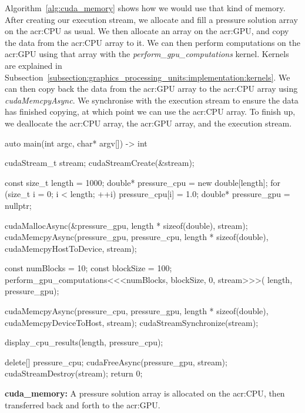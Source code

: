 Algorithm~\ref{alg:cuda_memory} shows how we would use that kind of memory. After creating our
execution stream, we allocate and fill a pressure solution array on the \acrshort{acr:CPU} as usual.
We then allocate an array on the \acrshort{acr:GPU}, and copy the data from the \acrshort{acr:CPU}
array to it. We can then perform computations on the \acrshort{acr:GPU} using that array with the
\textit{perform\_gpu\_computations} kernel. Kernels are explained in
Subsection~\ref{subsection:graphics_processing_units:implementation:kernels}. We can then copy back
the data from the \acrshort{acr:GPU} array to the \acrshort{acr:CPU} array using
\textit{cudaMemcpyAsync}. We synchronise with the execution stream to ensure the data has finished
copying, at which point we can use the \acrshort{acr:CPU} array. To finish up, we deallocate the
\acrshort{acr:CPU} array, the \acrshort{acr:GPU} array, and the execution stream.

\begin{algorithm}[H]
    \begin{cuda}
        auto main(int argc, char* argv[]) -> int {
            cudaStream_t stream;
            cudaStreamCreate(&stream); 

            const size_t length = 1000;
            double* pressure_cpu = new double[length];
            for (size_t i = 0; i < length; ++i){
                pressure_cpu[i] = 1.0;
            }
            double* pressure_gpu = nullptr;

            cudaMallocAsync(&pressure_gpu, length * sizeof(double), stream);
            cudaMemcpyAsync(pressure_gpu, pressure_cpu, length * sizeof(double), 
                cudaMemcpyHostToDevice, stream);

            const numBlocks = 10;
            const blockSize = 100;
            perform_gpu_computations<<<numBlocks, blockSize, 0, stream>>>(
            length, pressure_gpu);

            cudaMemcpyAsync(pressure_cpu, pressure_gpu, length * sizeof(double), 
                cudaMemcpyDeviceToHost, stream);
            cudaStreamSynchronize(stream);

            display_cpu_results(length, pressure_cpu);

            delete[] pressure_cpu;
            cudaFreeAsync(pressure_gpu, stream);
            cudaStreamDestroy(stream);
            return 0;
        }\end{cuda}
\caption{\textbf{cuda\_memory:} A pressure solution array is allocated on the \acrshort{acr:CPU}, then transferred back and forth to the \acrshort{acr:GPU}.}\label{alg:cuda_memory}
\end{algorithm}

